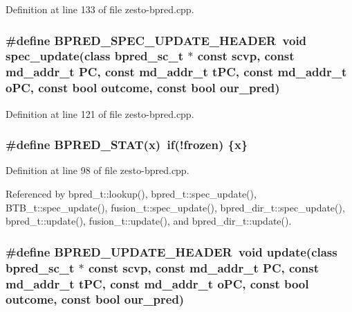 Definition at line 133 of file zesto-bpred.cpp.
\subsubsection[{BPRED\_\-SPEC\_\-UPDATE\_\-HEADER}]{\setlength{\rightskip}{0pt plus 5cm}\#define BPRED\_\-SPEC\_\-UPDATE\_\-HEADER~void spec\_\-update(class {\bf bpred\_\-sc\_\-t} $\ast$ const scvp, const {\bf md\_\-addr\_\-t} PC, const {\bf md\_\-addr\_\-t} tPC, const {\bf md\_\-addr\_\-t} oPC, const bool outcome, const bool our\_\-pred)}\label{zesto-bpred_8cpp_20ca5710057bcf66ab07e5faa6d0f533}




Definition at line 121 of file zesto-bpred.cpp.
\subsubsection[{BPRED\_\-STAT}]{\setlength{\rightskip}{0pt plus 5cm}\#define BPRED\_\-STAT(x)~if(!frozen) \{x\}}\label{zesto-bpred_8cpp_c5dc90bfbf7b76595c5840a22962ca8b}




Definition at line 98 of file zesto-bpred.cpp.

Referenced by bpred\_\-t::lookup(), bpred\_\-t::spec\_\-update(), BTB\_\-t::spec\_\-update(), fusion\_\-t::spec\_\-update(), bpred\_\-dir\_\-t::spec\_\-update(), bpred\_\-t::update(), fusion\_\-t::update(), and bpred\_\-dir\_\-t::update().
\subsubsection[{BPRED\_\-UPDATE\_\-HEADER}]{\setlength{\rightskip}{0pt plus 5cm}\#define BPRED\_\-UPDATE\_\-HEADER~void update(class {\bf bpred\_\-sc\_\-t} $\ast$ const scvp, const {\bf md\_\-addr\_\-t} PC, const {\bf md\_\-addr\_\-t} tPC, const {\bf md\_\-addr\_\-t} oPC, const bool outcome, const bool our\_\-pred)}\label{zesto-bpred_8cpp_97d66bb9bbcf7db0d437fdc06e031d46}




